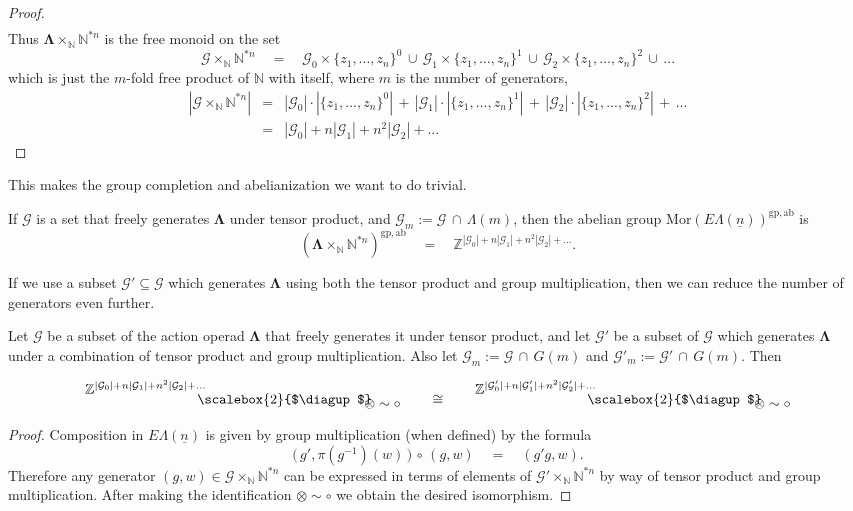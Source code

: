 \documentclass{amsbook} %
\newcommand{\ML}{\mathbf{\Lambda}}
\newcommand{\bigquotient}[2]{ \raisebox{0.75\height}{$#1$} \mkern-12mu\scalebox{2}{$\diagup$}\mkern-10mu \raisebox{-0.5\height}{$#2$} }
\newcommand{\ELn}{E\Lambda(\underline{n})}
\numberwithin{section}{chapter}
\begin{document}
\begin{proof}
\[\begin{array}{rcclcccl}
		\end{array}
\]
Thus $\ML \times_{\mathbb{N}} \mathbb{N}^{\ast n}$ is the free monoid on the set 
\[ \mathcal{G} \times_{\mathbb{N}} \mathbb{N}^{\ast n} \quad = \quad \mathcal{G}_0 \times \{ z_1, ..., z_n \}^0  \, \cup \, \mathcal{G}_1 \times \{ z_1, ..., z_n \}^1 \, \cup \, \mathcal{G}_2 \times \{ z_1, ..., z_n \}^2 \, \cup \, ...\]
which is just the $m$-fold free product of $\mathbb{N}$ with itself, where $m$ is the number of generators,
\[ \begin{array}{rll}
			|\mathcal{G} \times_{\mathbb{N}} \mathbb{N}^{\ast n}| & = & |\mathcal{G}_0| \cdot |\{ z_1, ..., z_n \}^0|  \, + \, |\mathcal{G}_1| \cdot |\{ z_1, ..., z_n \}^1| \, + \, |\mathcal{G}_2| \cdot |\{ z_1, ..., z_n \}^2| \, + \, ... \\
			& = & |\mathcal{G}_0| + n|\mathcal{G}_1| + n^2 |\mathcal{G}_2| + ... 
		\end{array}	
\]
\end{proof}

This makes the group completion and abelianization we want to do trivial. 

\begin{cor} \label{freemorgpab} If $\mathcal{G}$ is a set that freely generates $\ML$ under tensor product, and $\mathcal{G}_m := \mathcal{G} \, \cap \,  \Lambda(m)$, then the abelian group $\mathrm{Mor}(\ELn)^{\mathrm{gp}, \mathrm{ab}}$ is 
\[ (\ML \times_{\mathbb{N}} \mathbb{N}^{\ast n})^{\mathrm{gp}, \mathrm{ab}} \quad = \quad \mathbb{Z}^{|\mathcal{G}_0| + n|\mathcal{G}_1| + n^2 |\mathcal{G}_2| + ...}. \]
\end{cor}

If we use a subset $\mathcal{G}' \subseteq \mathcal{G}$ which generates $\ML$ using both the tensor product and group multiplication, then we can reduce the number of generators even further.

\begin{cor} Let $\mathcal{G}$ be a subset of the action operad $\ML$ that freely generates it under tensor product, and let $\mathcal{G'}$ be a subset of $\mathcal{G}$ which generates $\ML$ under a combination of tensor product and group multiplication. Also let $\mathcal{G}_m := \mathcal{G} \, \cap \,  G(m)$ and $\mathcal{G}'_m := \mathcal{G}' \, \cap \,  G(m)$. Then

\[ \bigquotient{\mathbb{Z}^{|\mathcal{G}_0| + n|\mathcal{G}_1| + n^2 |\mathcal{G}_2| + ...}}{\otimes \sim \circ} \quad \quad \cong \quad \quad \bigquotient{\mathbb{Z}^{|\mathcal{G}'_0| + n|\mathcal{G}'_1| + n^2 |\mathcal{G}'_2| + ...}}{\otimes \sim \circ} \]
\end{cor}
\begin{proof}
Composition in $\ELn$ is given by group multiplication (when defined) by the formula
\[ \big( \, g', \pi(g^{-1})(w) \, \big) \, \circ \, (g, w) \quad = \quad (g'g, w). \]
Therefore any generator $(g, w) \in \mathcal{G} \times_{\mathbb{N}} \mathbb{N}^{\ast n}$ can be expressed in terms of elements of $\mathcal{G}' \times_{\mathbb{N}} \mathbb{N}^{\ast n}$ by way of tensor product and group multiplication. After making the identification $\otimes \sim \circ$ we obtain the desired isomorphism.
\end{proof}
\end{document}
